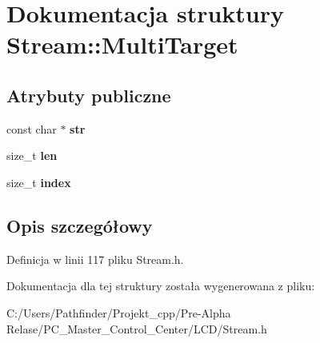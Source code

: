 \hypertarget{struct_stream_1_1_multi_target}{}\section{Dokumentacja struktury Stream\+:\+:Multi\+Target}
\label{struct_stream_1_1_multi_target}
\subsection*{Atrybuty publiczne}
\begin{DoxyCompactItemize}
\item 
\mbox{\label{struct_stream_1_1_multi_target_aea4691edf9c3f2a6602586cd587ead8d}} 
const char $\ast$ {\bfseries str}
\item 
\mbox{\label{struct_stream_1_1_multi_target_ae0ffba42be1143525f624242bf607a63}} 
size\+\_\+t {\bfseries len}
\item 
\mbox{\label{struct_stream_1_1_multi_target_a33cced896eb2dbabbeb7dd5dfa019e51}} 
size\+\_\+t {\bfseries index}
\end{DoxyCompactItemize}


\subsection{Opis szczegółowy}


Definicja w linii 117 pliku Stream.\+h.



Dokumentacja dla tej struktury została wygenerowana z pliku\+:\begin{DoxyCompactItemize}
\item 
C\+:/\+Users/\+Pathfinder/\+Projekt\+\_\+cpp/\+Pre-\/\+Alpha Relase/\+P\+C\+\_\+\+Master\+\_\+\+Control\+\_\+\+Center/\+L\+C\+D/Stream.\+h\end{DoxyCompactItemize}
